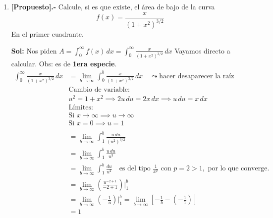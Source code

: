\documentclass[letterpaper,12pt]{article}
\theoremstyle{plain}
\theoremstyle{definition}
\begin{document}
\begin{enumerate}
\item \textbf{[Propuesto].-} Calcule, si es que existe, el área de bajo de la curva
$$f(x)=\frac{x}{(1+x^2)^{3/2}}$$
En el primer cuadrante.

\color{blue}
\textbf{Sol:} Nos piden $A = \displaystyle \int_{0}^{\infty} f(x) \, dx = \int_{0}^{\infty} \frac{x}{(1+x^2)^{3/2}} \, dx$
Vayamos directo a calcular. Obs: es de \textbf{1era especie}.
\begin{align*}
\int_{0}^{\infty} \frac{x}{(1+x^2)^{3/2}} \, dx &= \lim_{b \to \infty} \int_{0}^{b} \frac{x}{(1+x^2)^{3/2}} \, dx \quad \leadsto \text{hacer desaparecer la raíz} \\
&\text{Cambio de variable:} \\
&u^2 = 1+x^2 \implies 2u \, du = 2x \, dx \implies u \, du = x \, dx \\
&\text{Límites:} \\
&\text{Si } x \to \infty \implies u \to \infty \\
&\text{Si } x = 0 \implies u = 1 \\
\\
&= \lim_{b \to \infty} \int_{1}^{b} \frac{u \, du}{(u^2)^{3/2}} \\
&= \lim_{b \to \infty} \int_{1}^{b} \frac{u \, du}{u^3} \\
&= \lim_{b \to \infty} \int_{1}^{b} \frac{du}{u^2} \quad \text{es del tipo } \frac{1}{x^p} \text{ con } p=2 > 1, \text{ por lo que converge.} \\
&= \lim_{b \to \infty} \left( \frac{u^{-2+1}}{-2+1} \right) \bigg|_{1}^{b} \\
&= \lim_{b \to \infty} \left( -\frac{1}{u} \right) \bigg|_{1}^{b} = \lim_{b \to \infty} \left[ -\frac{1}{b} - \left( -\frac{1}{1} \right) \right] \\
&= 1
\end{align*}
\color{black}
\end{enumerate}
\end{document}
